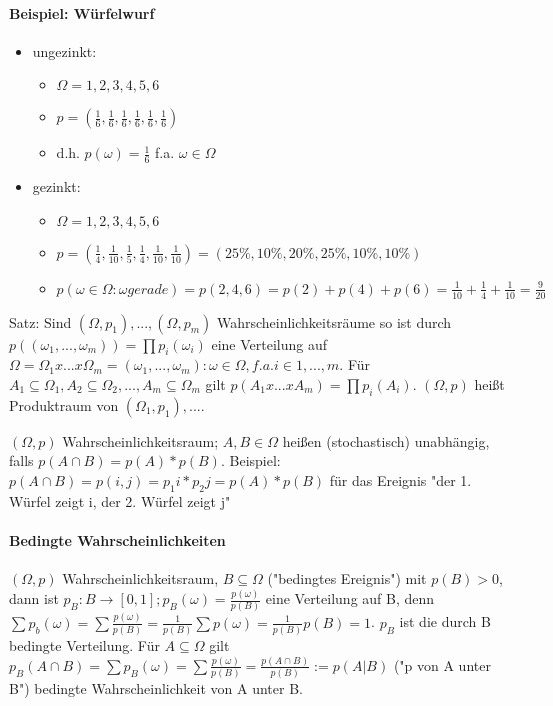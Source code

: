 \documentclass[a4paper]{article}
\begin{document}
\begin{multicols}{3}
    \paragraph{Beispiel: Würfelwurf}
    \begin{itemize}
        \item ungezinkt:
              \begin{itemize}
                  \item $\Omega = {1,2,3,4,5,6}$
                  \item $p=(\frac{1}{6},\frac{1}{6},\frac{1}{6},\frac{1}{6},\frac{1}{6},\frac{1}{6})$
                  \item d.h. $p(\omega)=\frac{1}{6}$ f.a. $\omega \in \Omega$
              \end{itemize}
        \item gezinkt:
              \begin{itemize}
                  \item $\Omega = {1,2,3,4,5,6}$
                  \item $p=(\frac{1}{4}, \frac{1}{10}, \frac{1}{5}, \frac{1}{4}, \frac{1}{10}, \frac{1}{10})=(25\%, 10\%, 20\%, 25\%, 10\%, 10\%)$
                  \item $p({\omega \in \Omega: \omega gerade})=p({2,4,6})=p(2)+p(4)+p(6)= \frac{1}{10}+ \frac{1}{4}+ \frac{1}{10} = \frac{9}{20}$
              \end{itemize}
    \end{itemize}
    
    Satz: Sind $(\Omega, p_1),...,(\Omega, p_m)$ Wahrscheinlichkeitsräume so ist durch $p((\omega_1,...,\omega_m))=\prod p_i(\omega_i)$ eine Verteilung auf $\Omega = \Omega_1 x ... x \Omega_m = {(\omega_1,...,\omega_m): \omega \in \Omega, f.a. i\in{1,...,m}}$. Für $A_1\subseteq \Omega_1, A_2\subseteq \Omega_2,...,A_m\subseteq \Omega_m$ gilt $p(A_1x...xA_m)=\prod p_i(A_i)$.
    $(\Omega, p)$ heißt Produktraum von $(\Omega_1, p_1),...$.
    
    $(\Omega, p)$ Wahrscheinlichkeitsraum; $A,B\in \Omega$ heißen (stochastisch) unabhängig, falls $p(A\cap B) = p(A)*p(B)$.
    Beispiel: $p(A\cap B) = p({i,j}) =p_1{i}*p_2{j} = p(A)*p(B)$ für das Ereignis "der 1. Würfel zeigt i, der 2. Würfel zeigt j"
    
    \paragraph{Bedingte Wahrscheinlichkeiten}
    $(\Omega, p)$ Wahrscheinlichkeitsraum, $B\subseteq \Omega$ ("bedingtes Ereignis") mit $p(B)>0$, dann ist $p_B:B\rightarrow [0,1]; p_B(\omega)=\frac{p(\omega)}{p(B)}$ eine Verteilung auf B, denn $\sum p_b(\omega)=\sum \frac{p(\omega)}{p(B)}=\frac{1}{p(B)} \sum p(\omega)= \frac{1}{p(B)} p(B)= 1$.
    $p_B$ ist die durch B bedingte Verteilung. Für $A\subseteq \Omega$ gilt $p_B(A\cap B)=\sum p_B(\omega)=\sum\frac{p(\omega)}{p(B)}= \frac{p(A\cap B)}{p(B)}:= p(A|B)$ ("p von A unter B") bedingte Wahrscheinlichkeit von A unter B.
    

\end{multicols}
\end{document}
